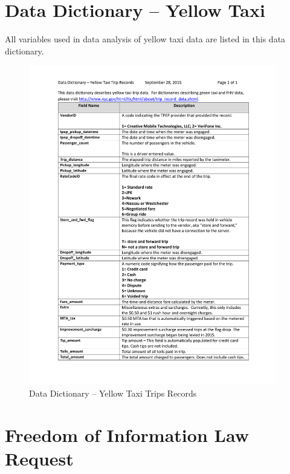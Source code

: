 \documentclass[12pt,twoside]{reedthesis}
\theoremstyle{definition}
\theoremstyle{definition}
\theoremstyle{definition}
\theoremstyle{remark}
\begin{document}
\chapter{Data Dictionary -- Yellow
Taxi}\label{data-dictionary-yellow-taxi}

All variables used in data analysis of yellow taxi data are listed in
this data dictionary.
\begin{figure}

{\centering \includegraphics[width=4.25in]{figure/data_dictionary_trip_records_yellow} 

}

\caption{Data Dictionary -- Yellow Taxi Trips Records}\label{fig:datadic}
\end{figure}
\chapter{Freedom of Information Law
Request}\label{freedom-of-information-law-request}
\end{document}
